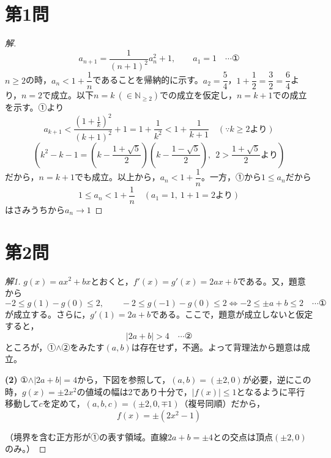 \documentclass[../main.tex]{subfiles}
\begin{document}
\section*{第1問}

\begin{proof}[解]
  \[
    a_{n+1}=\frac{1}{(n+1)^2}a_n^2+1, \qquad a_1=1 \quad\cdots\text{①}
  \]
  $n\ge2$の時，$a_n<1+\dfrac1n$であることを帰納的に示す。$a_2=\dfrac54$，$1+\dfrac12=\dfrac32=\dfrac64$より，$n=2$で成立。以下$n=k\ (\in\mathbb{N}_{\ge2})$での成立を仮定し，$n=k+1$での成立を示す。①より
  \[
    a_{k+1}<\frac{(1+\frac1k)^2}{(k+1)^2}+1=1+\frac{1}{k^2}<1+\frac{1}{k+1} \quad(\because k\ge2より)
  \]
  \[
    \left(k^2-k-1=\left(k-\frac{1+\sqrt5}{2}\right)\left(k-\frac{1-\sqrt5}{2}\right),\ \ 2>\frac{1+\sqrt5}{2}より\right)
  \]
  だから，$n=k+1$でも成立。以上から，$a_n<1+\dfrac1n$。一方，①から$1\le a_n$だから
  \[
    1\le a_n<1+\frac1n \quad(a_1=1,\ 1+1=2より)
  \]
  はさみうちから$a_n\to1$
\end{proof}

\newpage

\section*{第2問}

\begin{proof}[解1]
  $g(x)=ax^2+bx$とおくと，$f'(x)=g'(x)=2ax+b$である。又，題意から
  \[
    -2\le g(1)-g(0)\le2, \qquad -2\le g(-1)-g(0)\le2 \iff -2\le\pm a+b\le2 \quad\cdots\text{①}
  \]
  が成立する。さらに，$g'(1)=2a+b$である。ここで，題意が成立しないと仮定すると，
  \[
    |2a+b|>4 \quad\cdots\text{②}
  \]
  ところが，①$\wedge$②をみたす$(a,b)$は存在せず，不適。よって背理法から題意は成立。

  \textbf{(2)} ①$\wedge|2a+b|=4$から，下図を参照して，$(a,b)=(\pm2,0)$が必要，逆にこの時，$g(x)=\pm2x^2$の値域の幅は2であり十分で，$|f(x)|\le1$となるように平行移動して$c$を定めて，$(a,b,c)=(\pm2,0,\mp1)$（複号同順）だから，
  \[
    f(x)=\pm(2x^2-1)
  \]

  \begin{center}
  \end{center}
  （境界を含む正方形が①の表す領域。直線$2a+b=\pm4$との交点は頂点$(\pm2,0)$のみ。）
\end{proof}
\end{document}
